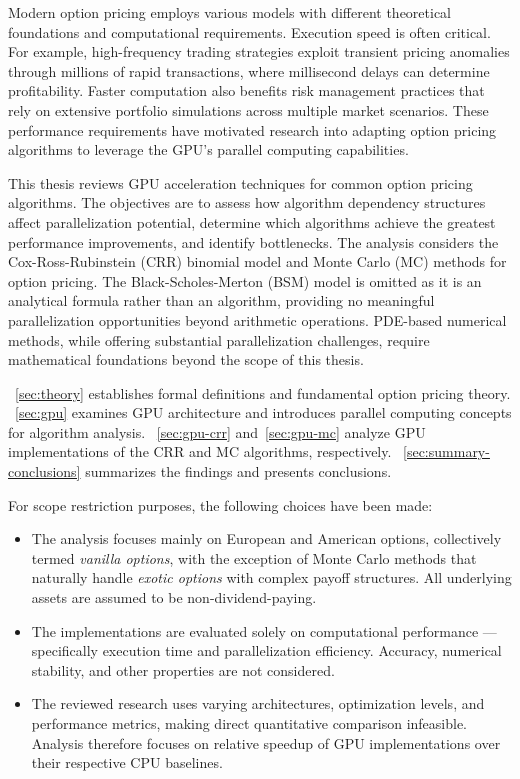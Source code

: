 \documentclass[english,12pt,a4paper,pdftex,sci,utf8]{aaltothesis}
\begin{document}
Modern option pricing employs various models with different theoretical foundations and computational requirements. Execution speed is often critical. For example, high-frequency trading strategies exploit transient pricing anomalies through millions of rapid transactions, where millisecond delays can determine profitability. Faster computation also benefits risk management practices that rely on extensive portfolio simulations across multiple market scenarios. These performance requirements have motivated research into adapting option pricing algorithms to leverage the GPU's parallel computing capabilities.

This thesis reviews GPU acceleration techniques for common option pricing algorithms. The objectives are to assess how algorithm dependency structures affect parallelization potential, determine which algorithms achieve the greatest performance improvements, and identify bottlenecks. The analysis considers the Cox-Ross-Rubinstein (CRR) binomial model and Monte Carlo (MC) methods for option pricing. The Black-Scholes-Merton (BSM) model is omitted as it is an analytical formula rather than an algorithm, providing no meaningful parallelization opportunities beyond arithmetic operations. PDE-based numerical methods, while offering substantial parallelization challenges, require mathematical foundations beyond the scope of this thesis.

~\cref{sec:theory} establishes formal definitions and fundamental option pricing theory. ~\cref{sec:gpu} examines GPU architecture and introduces parallel computing concepts for algorithm analysis. ~\cref{sec:gpu-crr} and~\cref{sec:gpu-mc} analyze GPU implementations of the CRR and MC algorithms, respectively. ~\cref{sec:summary-conclusions} summarizes the findings and presents conclusions.

For scope restriction purposes, the following choices have been made:
\begin{itemize}
\item The analysis focuses mainly on European and American options, collectively termed \emph{vanilla options}, with the exception of Monte Carlo methods that naturally handle \emph{exotic options} with complex payoff structures. All underlying assets are assumed to be non-dividend-paying.
    
\item The implementations are evaluated solely on computational performance --- specifically execution time and parallelization efficiency. Accuracy, numerical stability, and other properties are not considered.

\item The reviewed research uses varying architectures, optimization levels, and performance metrics, making direct quantitative comparison infeasible. Analysis therefore focuses on relative speedup of GPU implementations over their respective CPU baselines.
\end{itemize}
\end{document}
